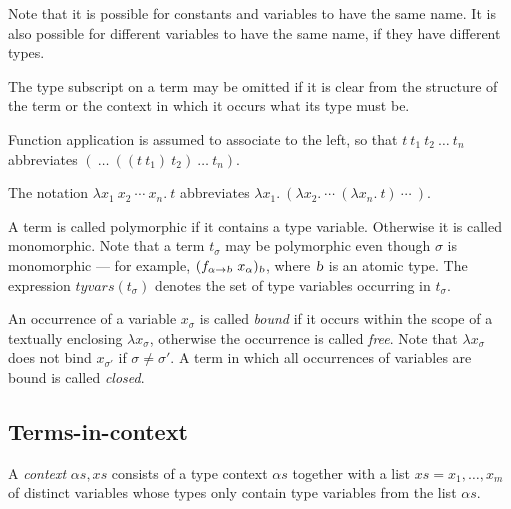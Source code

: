 Note that it is possible for constants and variables to have the
same name.  It is also possible for different variables to have the
same name, if they have different types.

The type subscript on a term may be omitted if it is clear from the
structure of the term or the context in which it occurs what its type
must be.

Function application is assumed to associate
to the left, so that $t\ t_1\ t_2\ \ldots\ t_n$ abbreviates $(\
\ldots\ ((t\ t_1)\ t_2)\ \ldots\ t_n)$.

The notation $\lambda x_1\ x_2\ \cdots\ x_n.\ t$ abbreviates $\lambda
x_1.\ (\lambda x_2.\ \cdots\ (\lambda x_n.\ t)\ \cdots\ )$.

A term is called polymorphic if it contains a type
variable. Otherwise it is called monomorphic. Note that a term
$t_{\sigma}$ may be polymorphic even though $\sigma$ is
monomorphic --- for example,
$(f_{\alpha\fun\textsl{b}}\ x_{\alpha})_{\textsl{b}}$, where $\textsl{b}$ is an atomic type. The expression
$tyvars(t_{\sigma})$ denotes the set of type variables occurring in
$t_{\sigma}$.

An occurrence of a variable $x_{\sigma}$ is called {\it
bound\/}
 if it occurs within the scope of a textually enclosing
$\lambda x_{\sigma}$, otherwise the occurrence is called {\it
free\/}. Note that $\lambda x_{\sigma}$ does not bind
$x_{\sigma'}$ if $\sigma\neq \sigma'$.  A term in which all occurrences
of variables are bound is called {\it closed\/}.

\subsection{Terms-in-context}
\label{terms-in-context}

A {\em context\/} $\alpha\!s,\!x\!s$ consists of a type
context $\alpha\!s$ together with a list $x\!s=x_{1},\ldots,x_{m}$ of
distinct variables whose types only contain type variables from the
list $\alpha\!s$.

